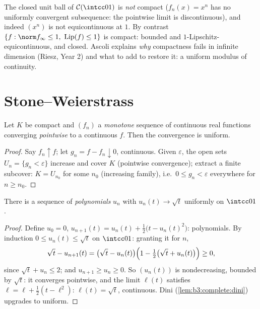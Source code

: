 \begin{example}\label{ex:b3:complete:ascoliexamples}
The closed unit ball of $\mathcal C(\intcc01)$ is \emph{not}
compact ($f_n(x) = x^n$ has no uniformly convergent
subsequence: the pointwise limit is discontinuous), and indeed
$(x^n)$ is not equicontinuous at $1$. By contrast $\{f : \norm
f_\infty \leq 1,\ \operatorname{Lip}(f) \leq 1\}$ is compact:
bounded and $1$-Lipschitz-equicontinuous, and closed. Ascoli
explains \emph{why} compactness fails in infinite dimension
(Riesz, Year 2) and what to add to restore it: a uniform
modulus of continuity.
\end{example}

\section{Stone--Weierstrass}

\begin{lemma}[Dini]\label{lem:b3:complete:dini}
Let $K$ be compact and $(f_n)$ a \emph{monotone} sequence of
continuous real functions converging \emph{pointwise} to a
continuous $f$. Then the convergence is
uniform.
\end{lemma}

\begin{proof}
Say $f_n \uparrow f$; let $g_n = f - f_n \downarrow 0$,
continuous. Given $\varepsilon$, the open sets $U_n = \{g_n <
\varepsilon\}$ increase and cover $K$ (pointwise convergence);
extract a finite subcover: $K = U_{n_0}$ for some $n_0$
(increasing family), i.e.\ $0 \leq g_n < \varepsilon$
everywhere for $n \geq n_0$.
\end{proof}

\begin{lemma}\label{lem:b3:complete:sqrt}
There is a sequence of \emph{polynomials} $u_n$ with $u_n(t) \to
\sqrt t$ uniformly on $\intcc01$.
\end{lemma}

\begin{proof}
Define $u_0 = 0$, $u_{n+1}(t) = u_n(t) + \frac12\bigl(t -
u_n(t)^2\bigr)$: polynomials. By induction $0 \leq u_n(t) \leq
\sqrt t$ on $\intcc01$: granting it for $n$,
\[
\sqrt t - u_{n+1}(t) = \bigl(\sqrt t - u_n(t)\bigr)
\Bigl(1 - \tfrac12\bigl(\sqrt t + u_n(t)\bigr)\Bigr) \geq 0,
\]
since $\sqrt t + u_n \leq 2$; and $u_{n+1} \geq u_n \geq 0$.
So $(u_n(t))$ is nondecreasing, bounded by $\sqrt t$: it
converges pointwise, and the limit $\ell(t)$ satisfies $\ell =
\ell + \frac12(t - \ell^2)$: $\ell(t) = \sqrt t$, continuous.
Dini (\cref{lem:b3:complete:dini}) upgrades to uniform.
\end{proof}

